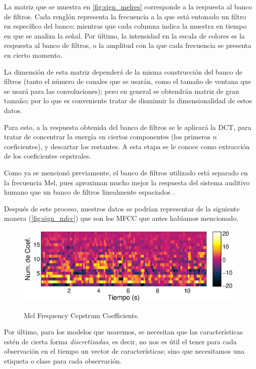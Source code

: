 La matriz que se muestra en \autoref{fig:sign_melres} corresponde a la respuesta al banco de filtros. Cada renglón representa la frecuencia a la que está entonado un filtro en específico del banco; mientras que cada columna indica la muestra en tiempo en que se analiza la señal. Por último, la intensidad en la escala de colores es la respuesta al banco de filtros, o la amplitud con la que cada frecuencia se presenta en cierto momento.

La dimensión de esta matriz dependerá de la misma construcción del banco de filtros (tanto el número de canales que se usarán, como el tamaño de ventana que se usará para las convoluciones); pero en general se obtendrán matriz de gran tamaño; por lo que es conveniente tratar de disminuir la dimensionalidad de estos datos.

Para esto, a la respuesta obtenida del banco de filtros se le aplicará la \ac{DCT}, para tratar de concentrar la energía en ciertos componentes (los primeros $n$ coeficientes), y descartar los restantes. A esta etapa se le conoce como extracción de los coeficientes cepstrales. 

Como ya se mencionó previamente, el banco de filtros utilizado está separado  en la frecuencia Mel, pues aproximan mucho mejor la respuesta del sistema auditivo humano que un banco de filtros linealmente espaciados \cite{Vyas2013}. 

Después de este proceso, nuestros datos se podrían representar de la siguiente manera (\autoref{fig:sign_mfcc}) que son los \ac{MFCC} que antes habíamos mencionado.
\begin{figure}[t]
  \myfloatalign
  {\includegraphics[width=0.9\linewidth]{gfx/chap2/mfcc_result3}} \quad
  \caption{Mel Frequency Cepstrum Coefficients.}
  \label{fig:sign_mfcc}
\end{figure}

Por último, para los modelos que usaremos, se necesitan que las características estén de cierta forma \textit{discretizadas}, es decir, no nos es útil el tener para cada observación en el tiempo un vector de características; sino que necesitamos una etiqueta o clase para cada observación. 

